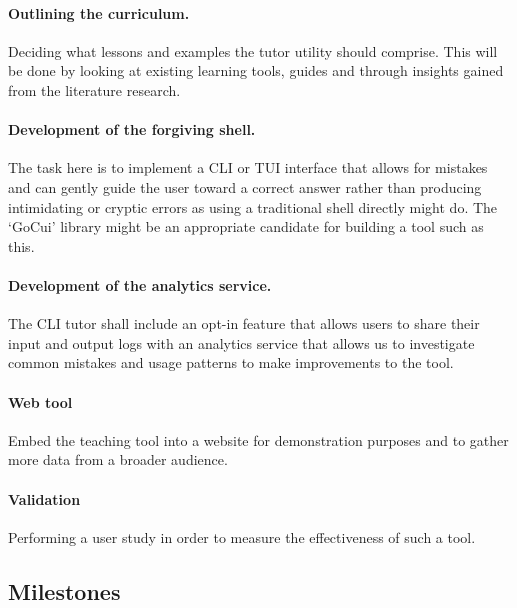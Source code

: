 \documentclass{task_description}
\begin{document}
\paragraph{Outlining the curriculum.} Deciding what lessons and examples
the tutor utility should comprise. This will be done by looking at existing
learning tools, guides and through insights gained from the literature
research.

\paragraph{Development of the forgiving shell.} The task here is to
implement a CLI or TUI interface that allows for mistakes and can gently guide
the user toward a correct answer rather than producing intimidating or cryptic
errors as using a traditional shell directly might do. The `GoCui' library
might be an appropriate candidate for building a tool such as this.

\paragraph{Development of the analytics service.} The CLI tutor shall include
an opt-in feature that allows users to share their input and output logs with
an analytics service that allows us to investigate common mistakes and usage
patterns to make improvements to the tool.

\paragraph{Web tool} Embed the teaching tool into a website for demonstration
purposes and to gather more data from a broader audience.

\paragraph{Validation} Performing a user study in order to measure the
effectiveness of such a tool.

\subsection*{Milestones}
\end{document}
